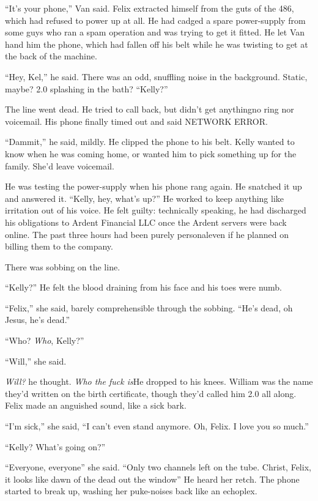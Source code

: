 \tb

“It’s your phone,” Van said. Felix extracted himself from the guts
of the 486, which had refused to power up at all. He had cadged a
spare power-supply from some guys who ran a spam operation and was
trying to get it fitted. He let Van hand him the phone, which had
fallen off his belt while he was twisting to get at the back of the
machine.

“Hey, Kel,” he said. There was an odd, snuffling noise in the
background. Static, maybe? 2.0 splashing in the bath? “Kelly?”

The line went dead. He tried to call back, but didn’t get
anything\dash{}no ring nor voicemail. His phone finally timed out and
said NETWORK ERROR.

“Dammit,” he said, mildly. He clipped the phone to his belt. Kelly
wanted to know when he was coming home, or wanted him to pick
something up for the family. She’d leave voicemail.

He was testing the power-supply when his phone rang again. He
snatched it up and answered it. “Kelly, hey, what’s up?” He worked
to keep anything like irritation out of his voice. He felt guilty:
technically speaking, he had discharged his obligations to Ardent
Financial LLC once the Ardent servers were back online. The past
three hours had been purely personal\dash{}even if he planned on billing
them to the company.

There was sobbing on the line.

“Kelly?” He felt the blood draining from his face and his toes were
numb.

“Felix,” she said, barely comprehensible through the sobbing. “He’s
dead, oh Jesus, he’s dead.”

“Who? \emph{Who}, Kelly?”

“Will,” she said.

\emph{Will?} he thought. \emph{Who the fuck is\dash{}}He dropped to his
knees. William was the name they’d written on the birth
certificate, though they’d called him 2.0 all along. Felix made an
anguished sound, like a sick bark.

“I’m sick,” she said, “I can’t even stand anymore. Oh, Felix. I
love you so much.”

“Kelly? What’s going on?”

“Everyone, everyone\dash{}” she said. “Only two channels left on the
tube. Christ, Felix, it looks like dawn of the dead out the
window\dash{}” He heard her retch. The phone started to break up, washing
her puke-noises back like an echoplex.

